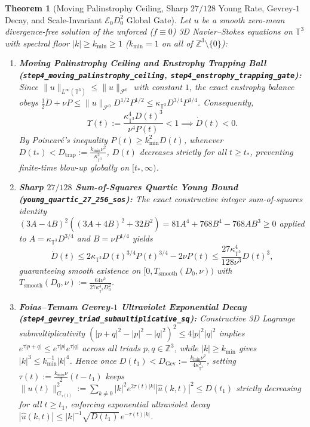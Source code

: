 \documentclass[11pt]{article}
\theoremstyle{plain}
\newtheorem{theorem}{Theorem}[section]
\theoremstyle{definition}
\begin{document}
\begin{theorem}[Moving Palinstrophy Ceiling, Sharp $27/128$ Young Rate, Gevrey-$1$ Decay, and Scale-Invariant $\mathcal{E}_0 D_0^2$ Global Gate]\label{thm:step4}
Let $u$ be a smooth zero-mean divergence-free solution of the unforced ($f \equiv 0$) 3D Navier--Stokes equations on $\mathbb{T}^3$ with spectral floor $|k| \ge k_{\min} \ge 1$ ($k_{\min} = 1$ on all of $\mathbb{Z}^3 \setminus \{0\}$):
\begin{enumerate}
  \item \textbf{Moving Palinstrophy Ceiling and Enstrophy Trapping Ball (\texttt{step4\_moving\_\allowbreak palinstrophy\_ceiling}, \texttt{step4\_enstrophy\_trapping\_gate}):} Since $\|u\|_{L^\infty(\mathbb{T}^3)} \le \|u\|_{\mathcal{F}^0}$ with constant $1$, the exact enstrophy balance obeys $\frac{1}{2}\dot{D} + \nu P \le \|u\|_{\mathcal{F}^0} D^{1/2} P^{1/2} \le \kappa_{\mathbb{T}^3} D^{3/4} P^{3/4}$. Consequently,
  \begin{equation}\label{eq:palinstrophy_ceiling}
    \Upsilon(t) := \frac{\kappa_{\mathbb{T}^3}^4 D(t)^3}{\nu^4 P(t)} < 1 \implies \dot{D}(t) < 0.
  \end{equation}
  By Poincar\'e's inequality $P(t) \ge k_{\min}^2 D(t)$, whenever $D(t_*) < D_{\mathrm{trap}} := \frac{k_{\min}\nu^2}{\kappa_{\mathbb{T}^3}^2}$, $D(t)$ decreases strictly for all $t \ge t_*$, preventing finite-time blow-up globally on $[t_*, \infty)$.
  \item \textbf{Sharp $27/128$ Sum-of-Squares Quartic Young Bound (\texttt{young\_quartic\_27\_256\_sos}):} The exact constructive integer sum-of-squares identity $(3A - 4B)^2((3A + 4B)^2 + 32 B^2) = 81 A^4 + 768 B^4 - 768 A B^3 \ge 0$ applied to $A = \kappa_{\mathbb{T}^3} D^{3/4}$ and $B = \nu P^{1/4}$ yields
  \begin{equation}\label{eq:sharp_young_ode}
    \dot{D}(t) \le 2\kappa_{\mathbb{T}^3} D(t)^{3/4} P(t)^{3/4} - 2\nu P(t) \le \frac{27 \kappa_{\mathbb{T}^3}^4}{128 \nu^3} D(t)^3,
  \end{equation}
  guaranteeing smooth existence on $[0, T_{\mathrm{smooth}}(D_0,\nu))$ with $T_{\mathrm{smooth}}(D_0,\nu) := \frac{64\nu^3}{27 \kappa_{\mathbb{T}^3}^4 D_0^2}$.
  \item \textbf{Foias--Temam Gevrey-$1$ Ultraviolet Exponential Decay (\texttt{step4\_gevrey\_triad\_\allowbreak submultiplicative\_sq}):} Constructive 3D Lagrange submultiplicativity $(|p+q|^2 - |p|^2 - |q|^2)^2 \le 4|p|^2|q|^2$ implies $e^{\tau|p+q|} \le e^{\tau|p|} e^{\tau|q|}$ across all triads $p,q \in \mathbb{Z}^3$, while $|k| \ge k_{\min}$ gives $|k|^3 \le k_{\min}^{-1}|k|^4$. Hence once $D(t_1) < D_{\mathrm{Gev}} := \frac{k_{\min}\nu^2}{4\kappa_{\mathbb{T}^3}^2}$, setting $\tau(t) := \frac{k_{\min}\nu}{2}(t - t_1)$ keeps $\|u(t)\|_{G_{\tau(t)}}^2 := \sum_{k \neq 0} |k|^2 e^{2\tau(t)|k|}|\hat{u}(k,t)|^2 \le D(t_1)$ strictly decreasing for all $t \ge t_1$, enforcing exponential ultraviolet decay $|\hat{u}(k,t)| \le |k|^{-1}\sqrt{D(t_1)}\,e^{-\tau(t)|k|}$.

\end{enumerate}
\end{theorem}
\end{document}

